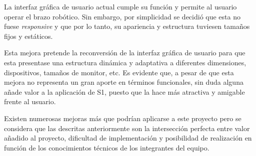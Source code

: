 \begin{itemize}
    La interfaz gráfica de usuario actual cumple su función y permite al usuario operar el brazo robótico. Sin embargo, por simplicidad se decidió que esta no fuese \textit{responsive} y que por lo tanto, su apariencia y estructura tuviesen tamaños fijos y estáticos.
    
    Esta mejora pretende la reconversión de la interfaz gráfica de usuario para que esta presentase una estructura dinámica y adaptativa a diferentes dimensiones, dispositivos, tamaños de monitor, etc. Es evidente que, a pesar de que esta mejora no representa un gran aporte en términos funcionales, sin duda alguna añade valor a la aplicación de \ac{S1}, puesto que la hace más atractiva y amigable frente al usuario.
\end{itemize}

Existen numerosas mejoras más que podrían aplicarse a este proyecto pero se considera que las descritas anteriormente son la intersección perfecta entre valor añadido al proyecto, dificultad de implementación y posibilidad de realización en función de los conocimientos técnicos de los integrantes del equipo.